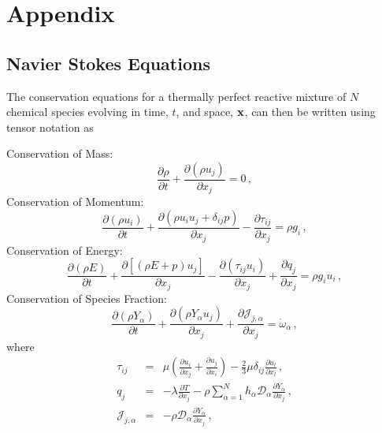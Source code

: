 \section{Appendix} 
\setcounter{equation}{0}
\subsection{Navier Stokes Equations} \label{subsection:Navier}
The conservation equations
for a thermally perfect reactive mixture of $N$ chemical species
evolving in time, $t$, and space, $\mathbf{x}$, can then be written
using tensor notation as \cite{HPerez:2011}\par
%
\indent Conservation of Mass:
\begin{equation}
  \label{eq:mass}
  \frac{\partial \rho}{\partial t} 
  + \frac{\partial (\rho u_j)}{\partial x_j}  =  0 \,,
\end{equation}
%
\indent Conservation of Momentum:
\begin{equation}
  \label{eq:momentum} 
  \frac{\partial (\rho u_i)}{\partial t} 
  + \frac{\partial (\rho u_i u_j + \delta_{ij} p)}{\partial x_j}  
  - \frac{\partial \tau_{ij}}{\partial x_j}
  =  \rho g_i \,, 
\end{equation}
%
\indent Conservation of Energy:
\begin{equation}
  \label{eq:energy}
  \frac{\partial (\rho E)}{\partial t} 
  + \frac{\partial [(\rho E + p) u_j]}{\partial x_j} 
  - \frac{\partial (\tau_{ij} u_i)}{\partial x_j} 
  + \frac{\partial q_j}{\partial x_j}
  =  \rho g_i u_i \,,  
\end{equation}
%
\indent Conservation of Species Fraction:
\begin{equation}
  \label{eq:species}
  \frac{\partial (\rho Y_\alpha)}{\partial t} 
  + \frac{\partial (\rho Y_\alpha u_j)}{\partial x_j}
  + \frac{\partial \mathcal{J}_{j,\alpha} }{\partial{x_j}} 
  =  \dot{\omega}_{\alpha} \,, 
\end{equation}
%
where
%
\begin{eqnarray}
  \label{eq:stress_tensor}
  \tau_{ij} & = & \mu \left( \frac{\partial u_i}{\partial x_j} 
  + \frac{\partial u_j}{\partial x_i} \right) 
  - \frac{2}{3} \mu \delta_{ij} \frac{\partial u_l}{\partial x_l} \,,  \\
  \label{eq:heat_flux}
  q_j & = & - \lambda \frac{\partial T}{\partial x_j} 
  - \rho \sum_{\alpha=1}^N h_\alpha\mathcal{D}_\alpha \frac{\partial Y_\alpha}{\partial x_j}  \,, \\
  \label{eq:species_diffusive_flux}
  \mathcal{J}_{j,\alpha} & = & - \rho \mathcal{D}_\alpha \frac{\partial Y_\alpha}{\partial x_j} \,,  
\end{eqnarray}
%



